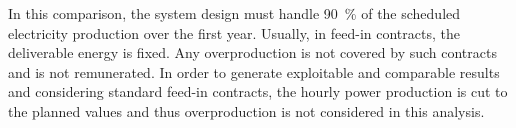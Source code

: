 In this comparison, the system design must handle 90~\% of the scheduled electricity production over the first year. Usually, in feed-in contracts, the deliverable energy is fixed. Any overproduction is not covered by such contracts and is not remunerated. In order to generate exploitable and comparable results and considering standard feed-in contracts, the hourly power production is cut to the planned values and thus overproduction is not considered in this analysis.

